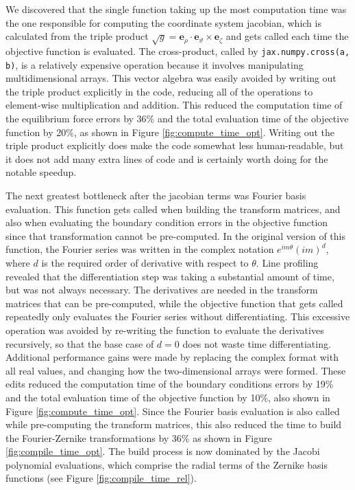 \documentclass{article}
\newcommand{\er}{{\mathbf e}_{\rho}}
\newcommand{\ev}{{\mathbf e}_{\vartheta}}
\newcommand{\ez}{{\mathbf e}_{\zeta}}
\begin{document}
We discovered that the single function taking up the most computation time was the one responsible for computing the coordinate system jacobian, which is calculated from the triple product $\sqrt{g} = \er\cdot\ev\times\ez$ and gets called each time the objective function is evaluated.
The cross-product, called by \texttt{jax.numpy.cross(a, b)}, is a relatively expensive operation because it involves manipulating multidimensional arrays.
This vector algebra was easily avoided by writing out the triple product explicitly in the code, reducing all of the operations to element-wise multiplication and addition.
This reduced the computation time of the equilibrium force errors by 36\% and the total evaluation time of the objective function by 20\%, as shown in Figure \ref{fig:compute_time_opt}.
Writing out the triple product explicitly does make the code somewhat less human-readable, but it does not add many extra lines of code and is certainly worth doing for the notable speedup.

The next greatest bottleneck after the jacobian terms was Fourier basis evaluation.
This function gets called when building the transform matrices, and also when evaluating the boundary condition errors in the objective function since that transformation cannot be pre-computed.
In the original version of this function, the Fourier series was written in the complex notation $e^{im\theta}(im)^d$, where $d$ is the required order of derivative with respect to $\theta$.
Line profiling revealed that the differentiation step was taking a substantial amount of time, but was not always necessary.
The derivatives are needed in the transform matrices that can be pre-computed, while the objective function that gets called repeatedly only evaluates the Fourier series without differentiating.
This excessive operation was avoided by re-writing the function to evaluate the derivatives recursively, so that the base case of $d=0$ does not waste time differentiating.
Additional performance gains were made by replacing the complex format with all real values, and changing how the two-dimensional arrays were formed.
These edits reduced the computation time of the boundary conditions errors by 19\% and the total evaluation time of the objective function by 10\%, also shown in Figure \ref{fig:compute_time_opt}.
Since the Fourier basis evaluation is also called while pre-computing the transform matrices, this also reduced the time to build the Fourier-Zernike transformations by 36\% as shown in Figure \ref{fig:compile_time_opt}.
The build process is now dominated by the Jacobi polynomial evaluations, which comprise the radial terms of the Zernike basis functions (see Figure \ref{fig:compile_time_rel}).
\end{document}
